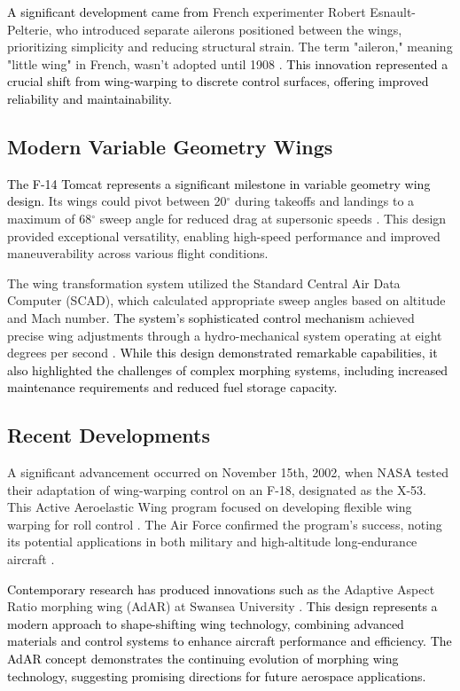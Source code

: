 \documentclass[letterpaper, journal, twoside]{IEEEtran}
\newcommand{\revision}[1]{\textcolor{black}{ #1}}
\begin{document}
\revision{A significant development came from} French experimenter Robert Esnault-Pelterie, who introduced separate ailerons positioned between the wings, prioritizing simplicity and reducing structural strain. The term "aileron," meaning "little wing" in French, wasn't adopted until 1908 \cite{crouch2008oldies}. \revision{This innovation represented a crucial shift from wing-warping to discrete control surfaces, offering improved reliability and maintainability.}

\subsection{Modern Variable Geometry Wings}
\revision{The F-14 Tomcat represents a significant milestone in variable geometry wing design}. Its wings could pivot between 20$^{\circ}$ during takeoffs and landings to a maximum of 68$^{\circ}$ sweep angle for reduced drag at supersonic speeds \cite{airforce2020f14}. This design provided exceptional versatility, enabling high-speed performance and improved maneuverability across various flight conditions.

The wing transformation system utilized the Standard Central Air Data Computer (SCAD), which calculated appropriate sweep angles based on altitude and Mach number. \revision{The system's sophisticated control mechanism} achieved precise wing adjustments through a hydro-mechanical system operating at eight degrees per second \cite{airforce2020f14}. \revision{While this design demonstrated remarkable capabilities, it also highlighted the challenges of complex morphing systems, including increased maintenance requirements and reduced fuel storage capacity.}


\subsection{Recent Developments}
A significant advancement occurred on November 15th, 2002, when NASA tested their adaptation of wing-warping control on an F-18, designated as the X-53. This Active Aeroelastic Wing program focused on developing flexible wing warping for roll control \cite{nasa2023aeroelastic, dibley2005development}. The Air Force confirmed the program's success, noting its potential applications in both military and high-altitude long-endurance aircraft \cite{barr2005wing}.

\revision{Contemporary research has produced innovations such as} the Adaptive Aspect Ratio morphing wing (AdAR) at Swansea University \cite{woods2015adaptive}. \revision{This design represents a modern approach to shape-shifting wing technology, combining advanced materials and control systems to enhance aircraft performance and efficiency. The AdAR concept demonstrates the continuing evolution of morphing wing technology, suggesting promising directions for future aerospace applications.}
\end{document}
